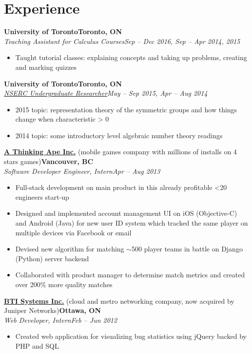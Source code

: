 \documentclass[10pt,letterpaper]{article}
\newcommand*\company[1]{\textbf{#1}}
\newcommand*\position[1]{\textit{#1}}
\newcommand*\location\company
\newcommand*\timespan\position
\begin{document}
\section*{Experience}
\company{University of Toronto}\hfill\location{Toronto, ON}\\
\position{Teaching Assistant for Calculus Courses}\hfill\timespan{Sep -- Dec 2016, Sep -- Apr 2014, 2015}
\begin{itemize}
\item Taught tutorial classes: explaining concepts and taking up problems, creating and marking quizzes
\end{itemize}
\company{University of Toronto}\hfill\location{Toronto, ON}\\
\position{\href{http://www.nserc-crsng.gc.ca/Students-Etudiants/UG-PC/USRA-BRPC_eng.asp}{NSERC Undergraduate Researcher}}\hfill\timespan{May -- Sep 2015, Apr -- Aug 2014}
\begin{itemize}
\item 2015 topic: representation theory of the symmetric groups and how things change when characteristic > 0
\item 2014 topic: some introductory level algebraic number theory readings
\end{itemize}
\company{\href{http://www.athinkingape.com/}{A Thinking Ape Inc.}} (mobile games company with millions of installs on 4 stars games)\hfill\location{Vancouver, BC}\\
\position{Software Developer Engineer, Intern}\hfill\timespan{Apr -- Aug 2013}
\begin{itemize}
\item Full-stack development on main product in this already profitable <20 engineers start-up
\item Designed and implemented account management UI on iOS (Objective-C) and Android (Java) for new user ID system which tracked the same player on multiple devices via Facebook or email
\item Devised new algorithm for matching \(\sim\)500 player teams in battle on Django (Python) server backend
\item Collaborated with product manager to determine match metrics and created over 200\% more quality matches
\end{itemize}
\company{\href{http://www.juniper.net/us/en/dm/bti/}{BTI Systems Inc.}} (cloud and metro networking company, now acquired by Juniper Networks)\hfill\location{Ottawa, ON}\\
\position{Web Developer, Intern}\hfill\timespan{Feb -- Jun 2012}
\begin{itemize}
\item Created web application for visualizing bug statistics using jQuery backed by PHP and SQL
\end{itemize}
\end{document}
